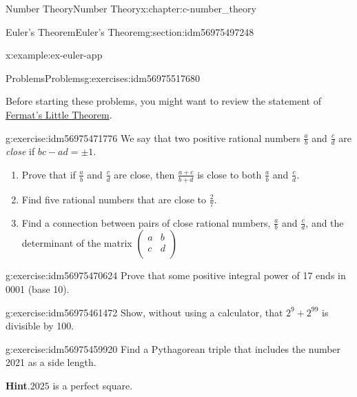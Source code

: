\documentclass[twoside,10pt,]{book}
\newcommand{\blocktitlefont}{\relax}
\numberwithin{equation}{section}
\begin{document}
\begin{chapterptx}{Number Theory}{}{Number Theory}{}{}{x:chapter:c-number_theory}
\begin{sectionptx}{Euler's Theorem}{}{Euler's Theorem}{}{}{g:section:idm56975497248}
\begin{example}{}{x:example:ex-euler-app}
\end{example}
\end{sectionptx}
%
%
\typeout{************************************************}
\typeout{************************************************}
%
\begin{exercises-section}{Problems}{}{Problems}{}{}{g:exercises:idm56975517680}
\begin{introduction}{}%
Before starting these problems, you might want to review the statement of \hyperref[x:theorem:theorem-fermat-little]{Fermat's Little Theorem}.%
\end{introduction}%
\begin{divisionexercise}{1}{}{}{g:exercise:idm56975471776}%
We say that two positive rational numbers \(\frac{a}{b}\) and \(\frac{c}{d}\) are \emph{close} if \(b c - ad = \pm 1\).%
\begin{enumerate}[label=(\alph*)]
\item{}Prove that if \(\frac{a}{b}\) and \(\frac{c}{d}\) are close, then \(\frac{a+c}{b+d}\) is close to both \(\frac{a}{b}\) and \(\frac{c}{d}\).%
\item{}Find five rational numbers that are close to \(\frac{2}{7}\).%
\item{}Find a connection between pairs of close rational numbers, \(\frac{a}{b}\) and \(\frac{c}{d}\), and  the determinant of the matrix \(\left(
\begin{array}{cc}
a  &  b   \\
c  &  d   \\
\end{array}
\right)\)%
\end{enumerate}
%
\end{divisionexercise}%
\begin{divisionexercise}{2}{}{}{g:exercise:idm56975470624}%
Prove that some positive integral power of 17 ends in 0001 (base 10).%
\end{divisionexercise}%
\begin{divisionexercise}{3}{}{}{g:exercise:idm56975461472}%
Show, without using a calculator, that \(2^9 + 2^{99}\) is divisible by 100.%
\end{divisionexercise}%
\begin{divisionexercise}{4}{}{}{g:exercise:idm56975459920}%
Find a Pythagorean triple that includes the number 2021 as a side length.%
\par\smallskip%
\noindent\textbf{\blocktitlefont Hint}.\hypertarget{g:hint:idm56975458576}{}\quad{}\(2025\) is a perfect square.%

\end{divisionexercise}
\end{exercises-section}
\end{chapterptx}
\end{document}
